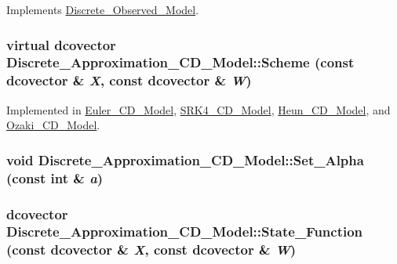 Implements \hyperlink{class_discrete___observed___model_8d56d86ea6b204672c8ebd720f1e11a6}{Discrete\_\-Observed\_\-Model}.\hypertarget{class_discrete___approximation___c_d___model_1ea9a1d618890fc51db6fa98eeb7af7f}{
\subsubsection[{Scheme}]{\setlength{\rightskip}{0pt plus 5cm}virtual dcovector Discrete\_\-Approximation\_\-CD\_\-Model::Scheme (const dcovector \& {\em X}, \/  const dcovector \& {\em W})}}
\label{class_discrete___approximation___c_d___model_1ea9a1d618890fc51db6fa98eeb7af7f}




Implemented in \hyperlink{class_euler___c_d___model_c113d0fdd6ba262f11ddfc0446827469}{Euler\_\-CD\_\-Model}, \hyperlink{class_s_r_k4___c_d___model_553c1dc82fe1e497ff73a919e6bd98e6}{SRK4\_\-CD\_\-Model}, \hyperlink{class_heun___c_d___model_98a85a23296e6c9f422f12063ece307b}{Heun\_\-CD\_\-Model}, and \hyperlink{class_ozaki___c_d___model_394a9716158c403c06c4416f01e661a9}{Ozaki\_\-CD\_\-Model}.\hypertarget{class_discrete___approximation___c_d___model_b6ebdd0ec42a24390d9446f10f7fa736}{
\subsubsection[{Set\_\-Alpha}]{\setlength{\rightskip}{0pt plus 5cm}void Discrete\_\-Approximation\_\-CD\_\-Model::Set\_\-Alpha (const int \& {\em a})}}
\label{class_discrete___approximation___c_d___model_b6ebdd0ec42a24390d9446f10f7fa736}


\hypertarget{class_discrete___approximation___c_d___model_83ef21b9993bfbef655874ca38777131}{
\subsubsection[{State\_\-Function}]{\setlength{\rightskip}{0pt plus 5cm}dcovector Discrete\_\-Approximation\_\-CD\_\-Model::State\_\-Function (const dcovector \& {\em X}, \/  const dcovector \& {\em W})}}
\label{class_discrete___approximation___c_d___model_83ef21b9993bfbef655874ca38777131}


